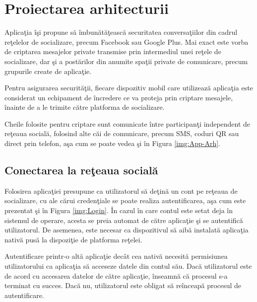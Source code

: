 \chapter{Proiectarea arhitecturii}

Aplica\c{t}ia \^{i}\c{s}i propune s\u{a} \^{i}mbun\u{a}t\u{a}\c{t}easc\u{a} securitatea conversa\c{t}iilor din cadrul re\c{t}elelor de socializare, precum Facebook sau Google Plus. Mai exact este vorba de criptarea mesajelor private transmise prin intermediul unei re\c{t}ele de socializare, dar \c{s}i a post\u{a}rilor din anumite spa\c{t}ii private de comunicare, precum grupurile create de aplica\c{t}ie.

Pentru asigurarea securit\u{a}\c{t}ii, fiecare dispozitiv mobil care utilizeaz\u{a} aplica\c{t}ia este considerat un echipament de \^{i}ncredere ce va proteja prin criptare mesajele, \^{i}nainte de a le trimite c\u{a}tre platforma de socializare.

Cheile folosite pentru criptare sunt comunicate \^{i}ntre participan\c{t}i independent de re\c{t}eaua social\u{a}, folosind alte c\u{a}i de comunicare, precum SMS, coduri QR sau direct prin telefon, a\c{s}a cum se poate vedea \c{s}i \^{i}n Figura \ref{img:App-Arh}.

\section{Conectarea la re\c{t}eaua social\u{a}}

Folosirea aplica\c{t}iei presupune ca utilizatorul s\u{a} de\c{t}in\u{a} un cont pe re\c{t}eaua de socializare, cu ale c\u{a}rui creden\c{t}iale se poate realiza autentificarea, a\c{s}a cum este prezentat \c{s}i \^{i}n Figura \ref{img:Login}. \^{I}n cazul \^{i}n care contul este setat deja \^{i}n sistemul de operare, acesta se preia automat de c\u{a}tre aplica\c{t}ie \c{s}i se autentific\u{a} utilizatorul. De asemenea, este necesar ca dispozitivul s\u{a} aib\u{a} instalat\u{a} aplica\c{t}ia nativ\u{a} pus\u{a} la dispozi\c{t}ie de platforma re\c{t}elei.


Autentificare printr-o alt\u{a} aplica\c{t}ie dec\^{a}t cea nativ\u{a} necesit\u{a} permisiunea utilizatorului ca aplica\c{t}ia s\u{a} acceseze datele din contul s\u{a}u. Dac\u{a} utilizatorul este de acord cu accesarea datelor de c\u{a}tre aplica\c{t}ie, \^{i}nseamn\u{a} c\u{a} procesul s-a terminat cu succes. Dac\u{a} nu, utilizatorul este obligat s\u{a} re\^{i}nceap\u{a} procesul de autentificare.


